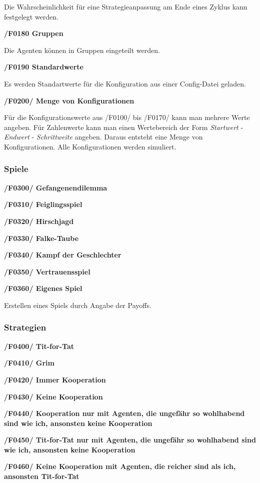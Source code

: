 Die Wahrscheinlichkeit für eine Strategieanpassung am Ende eines Zyklus kann festgelegt werden.

\textbf{/F0180 Gruppen}

Die Agenten können in Gruppen eingeteilt werden.

\textbf{/F0190 Standardwerte}

Es werden Standartwerte für die Konfiguration aus einer Config-Datei geladen.

\textbf{/F0200/ Menge von Konfigurationen}

Für die Konfigurationswerte aus /F0100/ bis /F0170/ kann man mehrere Werte angeben. Für Zahlenwerte kann man einen Wertebereich der Form \emph{Startwert} - \emph{Endwert} - \emph{Schrittweite} angeben. Daraus entsteht eine Menge von Konfigurationen. Alle Konfigurationen werden simuliert.

\subsubsection{Spiele}

\textbf{/F0300/ Gefangenendilemma}

\textbf{/F0310/ Feiglingsspiel}

\textbf{/F0320/ Hirschjagd}

\textbf{/F0330/ Falke-Taube}

\textbf{/F0340/ Kampf der Geschlechter}

\textbf{/F0350/ Vertrauensspiel}

\textbf{/F0360/ Eigenes Spiel}

Erstellen eines Spiels durch Angabe der Payoffs.

\subsubsection{Strategien}

\textbf{/F0400/ Tit-for-Tat}

\textbf{/F0410/ Grim}

\textbf{/F0420/ Immer Kooperation} 

\textbf{/F0430/ Keine Kooperation}

\textbf{/F0440/ Kooperation nur mit Agenten, die ungefähr so wohlhabend sind wie ich, ansonsten keine Kooperation}

\textbf{/F0450/ Tit-for-Tat nur mit Agenten, die ungefähr so wohlhabend sind wie ich, ansonsten keine Kooperation}

\textbf{/F0460/ Keine Kooperation mit Agenten, die reicher sind als ich, ansonsten Tit-for-Tat}

